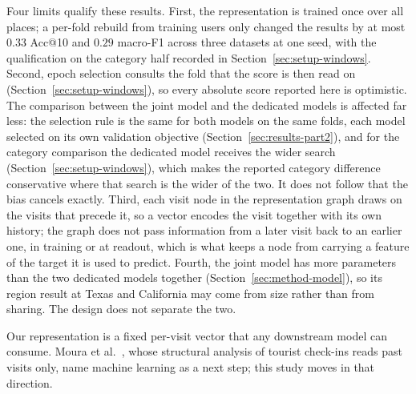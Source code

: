 Four limits qualify these results. First, the representation is trained once over all places; a
per-fold rebuild from training users only changed the results by at most $0.33$ Acc@10 and $0.29$
macro-F1 across three datasets at one seed, with the qualification on the category half recorded in
Section~\ref{sec:setup-windows}. Second, epoch selection consults the fold that the score is
then read on (Section~\ref{sec:setup-windows}), so every absolute score reported here is
optimistic. The comparison between the joint model and the dedicated models is affected far less:
the selection rule is the same for both models on the same folds, each model selected on its own
validation objective (Section~\ref{sec:results-part2}), and for the category comparison the
dedicated model receives the wider search (Section~\ref{sec:setup-windows}), which makes the
reported category difference conservative where that search is the wider of the two. It does not
follow that the bias cancels exactly.
Third, each
visit node in the representation graph draws on the visits that precede it, so a vector encodes the visit
together with its own history; the graph does not pass information from a later visit back to an earlier
one, in training or at readout, which is what keeps a node from carrying a feature of the target it is
used to predict. Fourth, the joint model has more parameters than the two dedicated models together
(Section~\ref{sec:method-model}), so its region result at Texas and California may come from size
rather than from sharing. The design does not separate the two.

Our representation is a fixed per-visit vector that any downstream model
can consume. Moura et al.~\cite{moura2025mobilityaware}, whose structural
analysis of tourist check-ins reads past visits only, name machine learning
as a next step; this study moves in that direction.
